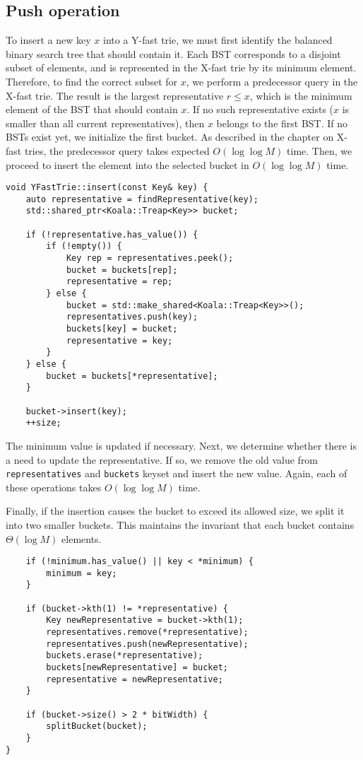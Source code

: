 \subsection{Push operation}

To insert a new key \( x \) into a Y-fast trie, we must first identify the balanced binary search tree that should contain it. Each BST corresponds to a disjoint subset of elements, and is represented in the X-fast trie by its minimum element. Therefore, to find the correct subset for \( x \), we perform a predecessor query in the X-fast trie. The result is the largest representative \( r \leq x \), which is the minimum element of the BST that should contain \( x \). If no such representative exists (\( x \) is smaller than all current representatives), then \( x \) belongs to the first BST. If no BSTs exist yet, we initialize the first bucket. As described in the chapter on X-fast tries, the predecessor query takes expected \( O(\log \log M) \) time. Then, we proceed to insert the element into the selected bucket in \( O(\log \log M) \) time.

\begin{verbatim}
void YFastTrie::insert(const Key& key) {
    auto representative = findRepresentative(key);
    std::shared_ptr<Koala::Treap<Key>> bucket;

    if (!representative.has_value()) {
        if (!empty()) {
            Key rep = representatives.peek();
            bucket = buckets[rep];
            representative = rep;
        } else {
            bucket = std::make_shared<Koala::Treap<Key>>();
            representatives.push(key);
            buckets[key] = bucket;
            representative = key;
        }
    } else {
        bucket = buckets[*representative];
    }

    bucket->insert(key);
    ++size;
\end{verbatim}

The minimum value is updated if necessary. Next, we determine whether there is a need to update the representative. If so, we remove the old value from \texttt{representatives} and \texttt{buckets} keyset and insert the new value. Again, each of these operations takes \( O(\log \log M) \) time.

Finally, if the insertion causes the bucket to exceed its allowed size, we split it into two smaller buckets. This maintains the invariant that each bucket contains \( \Theta(\log M) \) elements.

\begin{verbatim}
    if (!minimum.has_value() || key < *minimum) {
        minimum = key;
    }

    if (bucket->kth(1) != *representative) {
        Key newRepresentative = bucket->kth(1);
        representatives.remove(*representative);
        representatives.push(newRepresentative);
        buckets.erase(*representative);
        buckets[newRepresentative] = bucket;
        representative = newRepresentative;
    }

    if (bucket->size() > 2 * bitWidth) {
        splitBucket(bucket);
    }
}
\end{verbatim}

